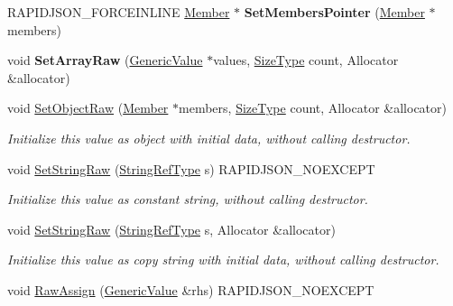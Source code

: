 \begin{DoxyCompactItemize}
\item 
R\+A\+P\+I\+D\+J\+S\+O\+N\+\_\+\+F\+O\+R\+C\+E\+I\+N\+L\+I\+NE \hyperlink{a00130_a7ccf27c44058b4c11c3efc6473afb886}{Member} $\ast$ {\bfseries Set\+Members\+Pointer} (\hyperlink{a00130_a7ccf27c44058b4c11c3efc6473afb886}{Member} $\ast$members)\hypertarget{a00130_a0b488cb0120b154eadde27dc0e694019}{}\label{a00130_a0b488cb0120b154eadde27dc0e694019}

\item 
void {\bfseries Set\+Array\+Raw} (\hyperlink{a00130}{Generic\+Value} $\ast$values, \hyperlink{a00677_a5ed6e6e67250fadbd041127e6386dcb5}{Size\+Type} count, Allocator \&allocator)\hypertarget{a00130_a8f5f309065479de40a16cf28a340da65}{}\label{a00130_a8f5f309065479de40a16cf28a340da65}

\item 
void \hyperlink{a00130_a26c8ec7d68858df1038506df7fcff22d}{Set\+Object\+Raw} (\hyperlink{a00130_a7ccf27c44058b4c11c3efc6473afb886}{Member} $\ast$members, \hyperlink{a00677_a5ed6e6e67250fadbd041127e6386dcb5}{Size\+Type} count, Allocator \&allocator)\hypertarget{a00130_a26c8ec7d68858df1038506df7fcff22d}{}\label{a00130_a26c8ec7d68858df1038506df7fcff22d}

\begin{DoxyCompactList}\small\item\em Initialize this value as object with initial data, without calling destructor. \end{DoxyCompactList}\item 
void \hyperlink{a00130_a1451603922dcdf34976f125dc60f70ee}{Set\+String\+Raw} (\hyperlink{a00130_a32e0f30ee278072374c8168b14d3317f}{String\+Ref\+Type} s) R\+A\+P\+I\+D\+J\+S\+O\+N\+\_\+\+N\+O\+E\+X\+C\+E\+PT\hypertarget{a00130_a1451603922dcdf34976f125dc60f70ee}{}\label{a00130_a1451603922dcdf34976f125dc60f70ee}

\begin{DoxyCompactList}\small\item\em Initialize this value as constant string, without calling destructor. \end{DoxyCompactList}\item 
void \hyperlink{a00130_ad3d91db36dfdbfc1af40a79aae07723c}{Set\+String\+Raw} (\hyperlink{a00130_a32e0f30ee278072374c8168b14d3317f}{String\+Ref\+Type} s, Allocator \&allocator)\hypertarget{a00130_ad3d91db36dfdbfc1af40a79aae07723c}{}\label{a00130_ad3d91db36dfdbfc1af40a79aae07723c}

\begin{DoxyCompactList}\small\item\em Initialize this value as copy string with initial data, without calling destructor. \end{DoxyCompactList}\item 
void \hyperlink{a00130_abb8ea2dfbe74ff4ee7dac6be31317f81}{Raw\+Assign} (\hyperlink{a00130}{Generic\+Value} \&rhs) R\+A\+P\+I\+D\+J\+S\+O\+N\+\_\+\+N\+O\+E\+X\+C\+E\+PT\hypertarget{a00130_abb8ea2dfbe74ff4ee7dac6be31317f81}{}\label{a00130_abb8ea2dfbe74ff4ee7dac6be31317f81}


\end{DoxyCompactItemize}
